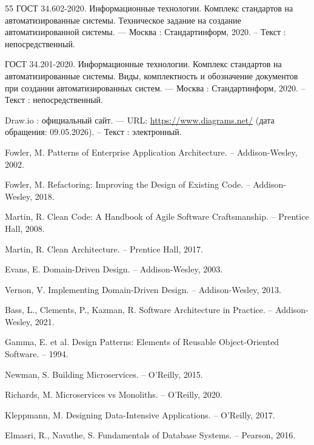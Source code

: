 \begin{thebibliography}{55}
	 ГОСТ 34.602-2020. Информационные технологии. Комплекс стандартов на автоматизированные системы. Техническое задание на создание автоматизированной системы. — Москва : Стандартинформ, 2020. – Текст : непосредственный.
	
	 ГОСТ 34.201-2020. Информационные технологии. Комплекс стандартов на автоматизированные системы. Виды, комплектность и обозначение документов при создании автоматизированных систем. — Москва : Стандартинформ, 2020. – Текст : непосредственный.
	
	 Draw.io : официальный сайт. — URL: \url{https://www.diagrams.net/} (дата обращения: 09.05.2026). – Текст : электронный.
	
	
	 Fowler, M. Patterns of Enterprise Application Architecture. – Addison-Wesley, 2002.
	
	 Fowler, M. Refactoring: Improving the Design of Existing Code. – Addison-Wesley, 2018.
	
	 Martin, R. Clean Code: A Handbook of Agile Software Craftsmanship. – Prentice Hall, 2008.
	
	 Martin, R. Clean Architecture. – Prentice Hall, 2017.
	
	 Evans, E. Domain-Driven Design. – Addison-Wesley, 2003.
	
	 Vernon, V. Implementing Domain-Driven Design. – Addison-Wesley, 2013.
	
	 Bass, L., Clements, P., Kazman, R. Software Architecture in Practice. – Addison-Wesley, 2021.
	
	 Gamma, E. et al. Design Patterns: Elements of Reusable Object-Oriented Software. – 1994.
	
	 Newman, S. Building Microservices. – O’Reilly, 2015.
	
	 Richards, M. Microservices vs Monoliths. – O’Reilly, 2020.
	
	 Kleppmann, M. Designing Data-Intensive Applications. – O’Reilly, 2017.
	
	
	 Elmasri, R., Navathe, S. Fundamentals of Database Systems. – Pearson, 2016.
	

\end{thebibliography}
